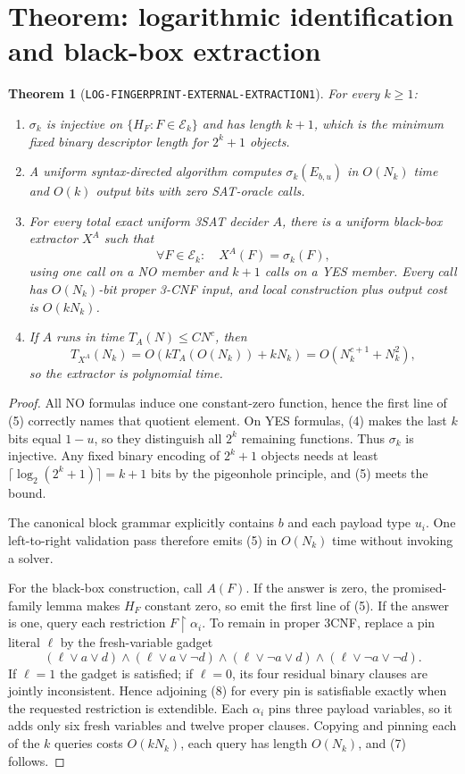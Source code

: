 \documentclass[11pt]{article}
\newtheorem{theorem}{Theorem}
\begin{document}
\section{Theorem: logarithmic identification and black-box extraction}
\begin{theorem}[\texttt{LOG-FINGERPRINT-EXTERNAL-EXTRACTION1}]
For every \(k\ge1\):
\begin{enumerate}
\item \(\sigma_k\) is injective on
\(\{H_F:F\in\mathcal E_k\}\) and has length \(k+1\), which is the minimum
fixed binary descriptor length for \(2^k+1\) objects.
\item A uniform syntax-directed algorithm computes \(\sigma_k(E_{b,u})\) in
\(O(N_k)\) time and \(O(k)\) output bits with zero SAT-oracle calls.
\item For every total exact uniform 3SAT decider \(A\), there is a uniform
black-box extractor \(X^A\) such that
\[
 \forall F\in\mathcal E_k:\quad X^A(F)=\sigma_k(F),                 \tag{6}
\]
using one call on a NO member and \(k+1\) calls on a YES member.  Every call
has \(O(N_k)\)-bit proper 3-CNF input, and local construction plus output
cost is \(O(kN_k)\).
\item If \(A\) runs in time \(T_A(N)\le C N^c\), then
\[
 T_{X^A}(N_k)=O\!\left(kT_A(O(N_k))+kN_k\right)
             =O(N_k^{c+1}+N_k^2),                                 \tag{7}
\]
so the extractor is polynomial time.
\end{enumerate}
\end{theorem}

\begin{proof}
All NO formulas induce one constant-zero function, hence the first line of
(5) correctly names that quotient element.  On YES formulas, (4) makes the
last \(k\) bits equal \(1-u\), so they distinguish all \(2^k\) remaining
functions.  Thus \(\sigma_k\) is injective.  Any fixed binary encoding of
\(2^k+1\) objects needs at least
\(\lceil\log_2(2^k+1)\rceil=k+1\) bits by the pigeonhole principle, and (5)
meets the bound.

The canonical block grammar explicitly contains \(b\) and each payload type
\(u_i\).  One left-to-right validation pass therefore emits (5) in
\(O(N_k)\) time without invoking a solver.

For the black-box construction, call \(A(F)\).  If the answer is zero, the
promised-family lemma makes \(H_F\) constant zero, so emit the first line of
(5).  If the answer is one, query each restriction \(F\upharpoonright
\alpha_i\).  To remain in proper 3CNF, replace a pin literal \(\ell\) by the
fresh-variable gadget
\[
 (\ell\vee a\vee d)\wedge(\ell\vee a\vee\neg d)\wedge
 (\ell\vee\neg a\vee d)\wedge(\ell\vee\neg a\vee\neg d).          \tag{8}
\]
If \(\ell=1\) the gadget is satisfied; if \(\ell=0\), its four residual
binary clauses are jointly inconsistent.  Hence adjoining (8) for every pin
is satisfiable exactly when the requested restriction is extendible.  Each
\(\alpha_i\) pins three payload variables, so it adds only six fresh
variables and twelve proper clauses.  Copying and pinning each of the \(k\)
queries costs \(O(kN_k)\), each query has length \(O(N_k)\), and (7) follows.
\end{proof}
\end{document}
